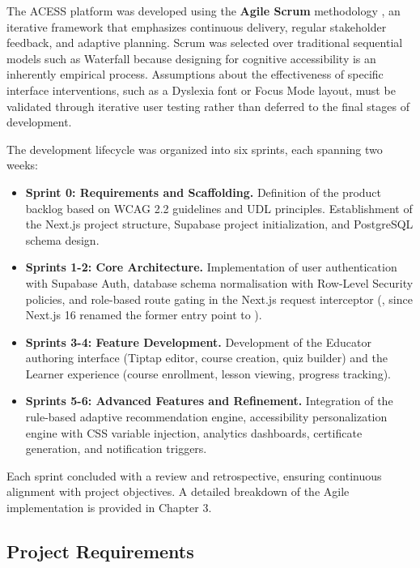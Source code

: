 \documentclass[12pt, oneside]{article} %
\newcommand{\tcode}[1]{\path{#1}}
\begin{document}
The ACESS platform was developed using the \textbf{Agile Scrum} methodology \cite{schwaber1995scrum}, an iterative framework that emphasizes continuous delivery, regular stakeholder feedback, and adaptive planning. Scrum was selected over traditional sequential models such as Waterfall because designing for cognitive accessibility is an inherently empirical process. Assumptions about the effectiveness of specific interface interventions, such as a Dyslexia font or Focus Mode layout, must be validated through iterative user testing rather than deferred to the final stages of development.

The development lifecycle was organized into six sprints, each spanning two weeks:

\begin{itemize}
    \item \textbf{Sprint 0: Requirements and Scaffolding.} Definition of the product backlog based on WCAG 2.2 guidelines and UDL principles. Establishment of the Next.js project structure, Supabase project initialization, and PostgreSQL schema design.
    \item \textbf{Sprints 1-2: Core Architecture.} Implementation of user authentication with Supabase Auth, database schema normalisation with Row-Level Security policies, and role-based route gating in the Next.js request interceptor (\tcode{src/proxy.ts}, since Next.js 16 renamed the former \tcode{middleware} entry point to \tcode{proxy}).
    \item \textbf{Sprints 3-4: Feature Development.} Development of the Educator authoring interface (Tiptap editor, course creation, quiz builder) and the Learner experience (course enrollment, lesson viewing, progress tracking).
    \item \textbf{Sprints 5-6: Advanced Features and Refinement.} Integration of the rule-based adaptive recommendation engine, accessibility personalization engine with CSS variable injection, analytics dashboards, certificate generation, and notification triggers.
\end{itemize}

Each sprint concluded with a review and retrospective, ensuring continuous alignment with project objectives. A detailed breakdown of the Agile implementation is provided in Chapter 3.

\subsection{Project Requirements}
\end{document}
